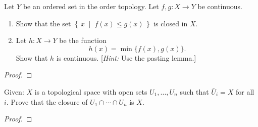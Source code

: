 \newpage
\begin{problem}[Munkres \S18, p.\,111-112, 8(a,b)]
Let $Y$ be an ordered set in the order topology. Let
$f,g\colon X\to Y$ be continuous.
\begin{enumerate}[noitemsep,label=(\alph*)]
\item Show that the set
  $\left\{\,x\;\middle|\;f(x)\leq g(x)\,\right\}$ is closed in $X$.
\item Let $h\colon X\to Y$ be the
  function \[h(x)=\min\{f(x),g(x)\}.\] Show that $h$ is
  continuous. [\emph{Hint:} Use the pasting lemma.]
\end{enumerate}
\end{problem}
\begin{proof}

\end{proof}
\newpage
\begin{problem}
Given: $X$ is a topological space with open sets $U_1,...,U_n$
such that $\bar U_i=X$ for all $i$. Prove that the closure of
$U_1\cap\cdots\cap U_n$ is $X$.
\end{problem}
\begin{proof}
\end{proof}

